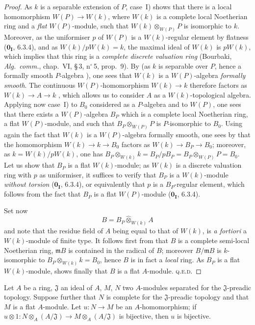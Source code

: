 \begin{proof}
As $k$ is a separable extension of $P$, case~I) shows that there is a local homomorphism $W(P)\to W(k)$, where $W(k)$ is a complete local Noetherian ring and a \emph{flat} $W(P)$-module, such that $W(k)\otimes_{W(P)}P$ is isomorphic to $k$.
Moreover, as the uniformiser $p$ of $W(P)$ is a $W(k)$-regular element by flatness ($\mathbf{0_I}$, 6.3.4), and as
$W(k)/pW(k)=k$, the maximal ideal of $W(k)$ is $pW(k)$, which implies that this ring is a \emph{complete discrete valuation ring} (Bourbaki, \emph{Alg.\ comm.}, chap.~VI, \S\,3, n$^\circ$\,5, prop.~9).
By  (as $k$ is separable over $P$, hence a formally smooth $P$-algebra ), one sees that $W(k)$ is a $W(P)$-algebra \emph{formally smooth}.
The continuous $W(P)$-homomorphism $W(k)\to k$ therefore factors as $W(k)\to A\to k$ ,
which allows us to consider $A$ as a $W(k)$-topological algebra.
Applying now case~I) to $B_0$ considered as a $P$-algebra and to $W(P)$, one sees that there exists a $W(P)$-algebra $B_P$ which is a complete local Noetherian ring, a flat $W(P)$-module, and such that $B_P\otimes_{W(P)}P$ is $P$-isomorphic to $B_0$.
Using again the fact that $W(k)$ is a $W(P)$-algebra formally smooth, one sees by  that the homomorphism $W(k)\to k\to B_0$ factors as $W(k)\to B_P\to B_0$; moreover, as $k=W(k)/pW(k)$, one has $B_P\otimes_{W(k)}k = B_P/pB_P = B_P\otimes_{W(P)}P = B_0$.
Let us show that $B_P$ is a flat $W(k)$-module; as $W(k)$ is a discrete valuation ring with $p$ as uniformiser, it suffices to verify that $B_P$ is a $W(k)$-module \emph{without torsion} ($\mathbf{0_I}$, 6.3.4), or equivalently that $p$ is a $B_P$-regular element, which follows from the fact that $B_P$ is a flat $W(P)$-module ($\mathbf{0_I}$, 6.3.4).

Set now
\[
  B = B_P\widehat{\otimes}_{W(k)} A
\]
and note that the residue field of $A$ being equal to that of $W(k)$, is \emph{a fortiori} a $W(k)$-module of finite type.
It follows first from  that $B$ is a complete semi-local Noetherian ring, $\mathfrak{m}B$ is contained in the radical of $B$; moreover $B/\mathfrak{m}B$ is $k$-isomorphic to $B_P\otimes_{W(k)}k = B_0$, hence $B$ is in fact a \emph{local} ring.
As $B_P$ is a flat $W(k)$-module,  shows finally that $B$ is a flat $A$-module. \textsc{q.e.d.}
\end{proof}

\begin{lemma}[19.7.1.4]
\label{0.19.7.1.4}
Let $A$ be a ring, $\mathfrak{J}$ an ideal of $A$, $M$, $N$ two $A$-modules separated for the $\mathfrak{J}$-preadic topology.
Suppose further that $N$ is complete for the $\mathfrak{J}$-preadic topology and that $M$ is a flat $A$-module.
Let $u:N\to M$ be an $A$-homomorphism; if $u\otimes 1:N\otimes_A(A/\mathfrak{J})\to M\otimes_A(A/\mathfrak{J})$ is bijective, then $u$ is bijective.
\end{lemma}

